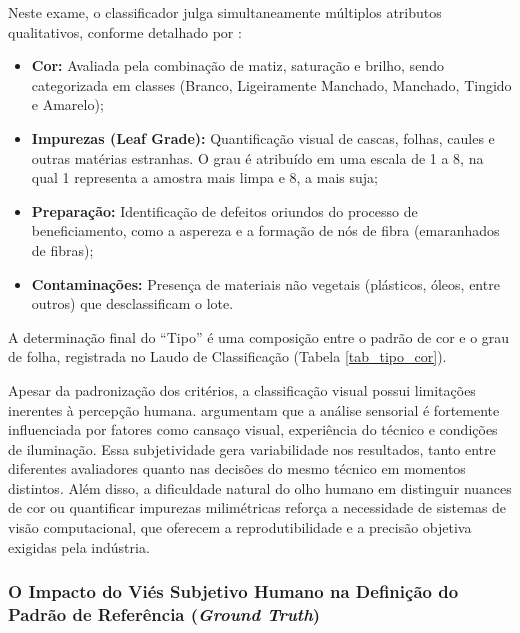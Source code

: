         Neste exame, o classificador julga simultaneamente múltiplos atributos qualitativos, conforme detalhado por :

        \begin{itemize}
            \item \textbf{Cor:} Avaliada pela combinação de matiz, saturação e brilho, sendo categorizada em classes (Branco, Ligeiramente Manchado, Manchado, Tingido e Amarelo);
            \item \textbf{Impurezas (Leaf Grade):} Quantificação visual de cascas, folhas, caules e outras matérias estranhas. O grau é atribuído em uma escala de 1 a 8, na qual 1 representa a amostra mais limpa e 8, a mais suja;
            \item \textbf{Preparação:} Identificação de defeitos oriundos do processo de beneficiamento, como a aspereza e a formação de nós de fibra (emaranhados de fibras);
            \item \textbf{Contaminações:} Presença de materiais não vegetais (plásticos, óleos, entre outros) que desclassificam o lote.
        \end{itemize}

        A determinação final do ``Tipo'' é uma composição entre o padrão de cor e o grau de folha, registrada no Laudo de Classificação (Tabela \ref{tab_tipo_cor}).

        Apesar da padronização dos critérios, a classificação visual possui limitações inerentes à percepção humana.  argumentam que a análise sensorial é fortemente influenciada por fatores como cansaço visual, experiência do técnico e condições de iluminação. Essa subjetividade gera variabilidade nos resultados, tanto entre diferentes avaliadores quanto nas decisões do mesmo técnico em momentos distintos. Além disso, a dificuldade natural do olho humano em distinguir nuances de cor ou quantificar impurezas milimétricas reforça a necessidade de sistemas de visão computacional, que oferecem a reprodutibilidade e a precisão objetiva exigidas pela indústria.

        

    \subsubsection{O Impacto do Viés Subjetivo Humano na Definição do Padrão de Referência (\textit{Ground Truth})}
    \label{sec:vies_humano_gt}

